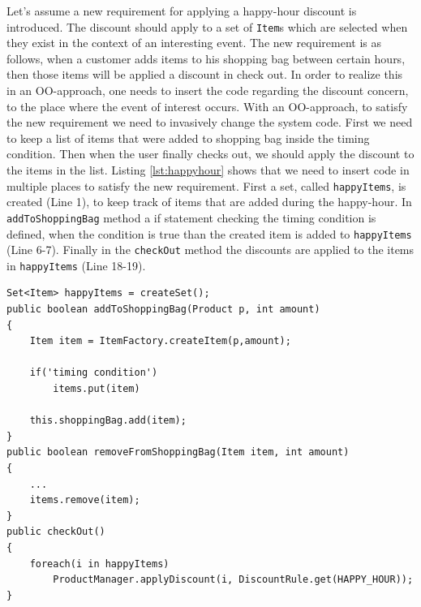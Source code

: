 \documentclass{llncs}
\begin{document}
Let's assume a new requirement for applying a happy-hour discount is introduced. The discount should apply to a set of \texttt{Item}s which are selected when they exist in the context of an interesting event. The new requirement is as follows, \textsf{when a customer adds items to his shopping bag between certain hours, then those items will be applied a discount in check out}. In order to realize this in an OO-approach, one needs to insert the code regarding the discount concern, to the place where the event of interest occurs.
With an OO-approach, to satisfy the new requirement we need to invasively change the system code. First we need to keep a list of items that were added to shopping bag inside the timing condition. Then when the user finally checks out, we should apply the discount to the items in the list. Listing \ref{lst:happyhour} shows that we need to insert code in multiple places to satisfy the new requirement. First a set, called \texttt{happyItems}, is created (Line 1), to keep track of items that are added during the happy-hour. In \texttt{addToShoppingBag} method a if statement checking the timing condition is defined, when the condition is true than the created item is added to \texttt{happyItems} (Line 6-7).  Finally in the \texttt{checkOut} method the discounts are applied to the items in \texttt{happyItems} (Line 18-19). 

\begin{lstlisting}[float, caption={A Java implementation of Happy-hour discount rule}, label={lst:happyhour}]
Set<Item> happyItems = createSet();
public boolean addToShoppingBag(Product p, int amount)
{
	Item item = ItemFactory.createItem(p,amount);
	
	if('timing condition')
		items.put(item)
	
	this.shoppingBag.add(item);
}
public boolean removeFromShoppingBag(Item item, int amount)
{
	...
	items.remove(item);
}
public checkOut()
{
	foreach(i in happyItems)
		ProductManager.applyDiscount(i, DiscountRule.get(HAPPY_HOUR));
}
\end{lstlisting}
\end{document}
